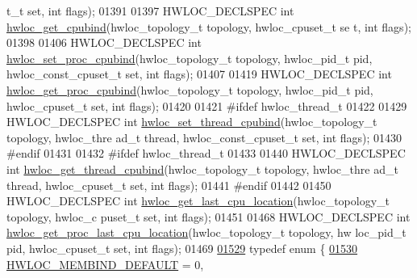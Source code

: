 \begin{DoxyCode}
      t\_t \textcolor{keyword}{set}, \textcolor{keywordtype}{int} flags);
01391 
01397 HWLOC\_DECLSPEC \textcolor{keywordtype}{int} \hyperlink{a00049_gab52f83ab16eac465da55e16bdd30df77}{hwloc_get_cpubind}(hwloc\_topology\_t topology, hwloc\_cpuset\_t \textcolor{keyword}{se
      t}, \textcolor{keywordtype}{int} flags);
01398 
01406 HWLOC\_DECLSPEC \textcolor{keywordtype}{int} \hyperlink{a00049_gac0ef3510b4e9c1273029ecf94e8c9686}{hwloc_set_proc_cpubind}(hwloc\_topology\_t topology, hwloc\_pid\_t 
      pid, hwloc\_const\_cpuset\_t \textcolor{keyword}{set}, \textcolor{keywordtype}{int} flags);
01407 
01419 HWLOC\_DECLSPEC \textcolor{keywordtype}{int} \hyperlink{a00049_gaa1373a002b9a0a87eb002e26c590f2da}{hwloc_get_proc_cpubind}(hwloc\_topology\_t topology, hwloc\_pid\_t 
      pid, hwloc\_cpuset\_t \textcolor{keyword}{set}, \textcolor{keywordtype}{int} flags);
01420 
01421 \textcolor{preprocessor}{#ifdef hwloc\_thread\_t}
01422 \textcolor{preprocessor}{}
01429 HWLOC\_DECLSPEC \textcolor{keywordtype}{int} \hyperlink{a00049_gaab65c34a0bc19c5a823f824543cedbd4}{hwloc_set_thread_cpubind}(hwloc\_topology\_t topology, hwloc\_thre
      ad\_t thread, hwloc\_const\_cpuset\_t \textcolor{keyword}{set}, \textcolor{keywordtype}{int} flags);
01430 \textcolor{preprocessor}{#endif}
01431 \textcolor{preprocessor}{}
01432 \textcolor{preprocessor}{#ifdef hwloc\_thread\_t}
01433 \textcolor{preprocessor}{}
01440 HWLOC\_DECLSPEC \textcolor{keywordtype}{int} \hyperlink{a00049_ga089cecfdb9a50e5c5cd1b6ff17352d42}{hwloc_get_thread_cpubind}(hwloc\_topology\_t topology, hwloc\_thre
      ad\_t thread, hwloc\_cpuset\_t \textcolor{keyword}{set}, \textcolor{keywordtype}{int} flags);
01441 \textcolor{preprocessor}{#endif}
01442 \textcolor{preprocessor}{}
01450 HWLOC\_DECLSPEC \textcolor{keywordtype}{int} \hyperlink{a00049_ga8e9a4b5ee3eaa18fd3a229790c6b5b17}{hwloc_get_last_cpu_location}(hwloc\_topology\_t topology, hwloc\_c
      puset\_t \textcolor{keyword}{set}, \textcolor{keywordtype}{int} flags);
01451 
01468 HWLOC\_DECLSPEC \textcolor{keywordtype}{int} \hyperlink{a00049_ga1e005ddb9701e6a993a9eb8abe67a710}{hwloc_get_proc_last_cpu_location}(hwloc\_topology\_t topology, hw
      loc\_pid\_t pid, hwloc\_cpuset\_t \textcolor{keyword}{set}, \textcolor{keywordtype}{int} flags);
01469 
\hypertarget{a00033_source_l01529}{}\hyperlink{a00050_gac9764f79505775d06407b40f5e4661e8}{01529} \textcolor{keyword}{typedef} \textcolor{keyword}{enum} \{
\hypertarget{a00033_source_l01530}{}\hyperlink{a00050_ggac9764f79505775d06407b40f5e4661e8a18675bb80ebc1bce5b652e9de8f3998c}{01530}   \hyperlink{a00050_ggac9764f79505775d06407b40f5e4661e8a18675bb80ebc1bce5b652e9de8f3998c}{HWLOC_MEMBIND_DEFAULT} =       0,      

\end{DoxyCode}
